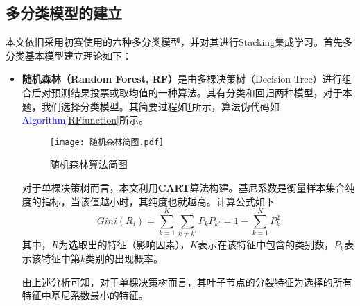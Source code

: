 \documentclass{MathorCupmodeling}
\begin{document}
	\subsection{多分类模型的建立}
	本文依旧采用初赛使用的六种多分类模型，并对其进行Stacking集成学习。首先多分类基本模型建立理论如下：
	\begin{itemize}
		\item \textbf{随机森林（Random Forest, RF）}是由多棵决策树（Decision Tree）进行组合后对预测结果投票或取均值的一种算法\textcolor{blue}{\cite{prf}}。其有分类和回归两种模型，对于本题，我们选择分类模型。其简要过程如\textcolor{blue}{\cref{fig:RF}}所示，算法伪代码如\textcolor{blue}{Algorithm\ref{RFfunction}}所示。

		\begin{figure}[H]
			\centerline{\texttt{[image: 随机森林简图.pdf]}}
			\caption{随机森林算法简图}\label{fig:RF}
		\end{figure}
		
		对于单棵决策树而言，本文利用\textbf{CART}算法\textcolor{blue}{\cite{prf}}构建。基尼系数是衡量样本集合纯度的指标，当该值越小时，其纯度也就越高。计算公式如下
		\begin{equation}
			Gini\left( R_i \right)=\sum\limits_{k=1}^{K}\sum\limits_{k\ne k'}P_k P_{k'}=1-\sum\limits_{k=1}^{K}P_k^2 \label{fGini}
		\end{equation}
		其中，$R$为选取出的特征（影响因素），$K$表示在该特征中包含的类别数，$P_k$表示该特征中第$k$类别的出现概率。
	
		由上述分析可知，对于单棵决策树而言，其叶子节点的分裂特征为选择的所有特征中基尼系数最小的特征。

\end{itemize}
\end{document}
